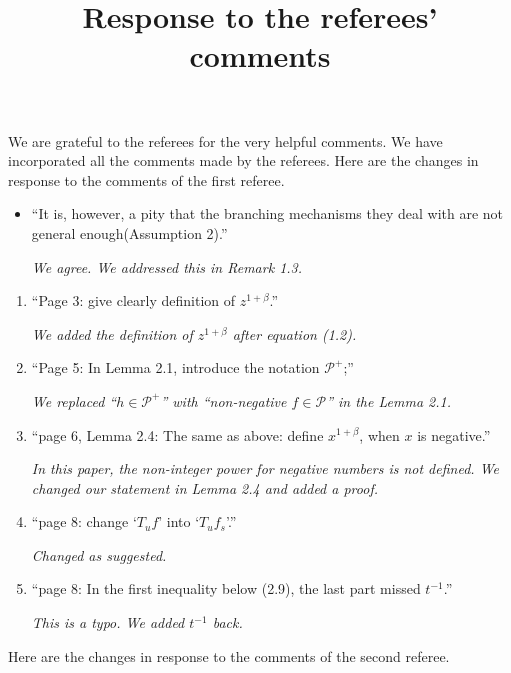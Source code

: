 \documentclass[12pt,a4paper]{amsart}
\title[Response]{\large Response to the referees' comments}
\begin{document}
	\maketitle	
	We are grateful to the referees for the very helpful comments.
	We have incorporated all the comments made by the referees.
	Here are the changes in response to the comments of the first referee.
	
	\begin{itemize}
		\item ``It is, however, a pity that the branching mechanisms they deal with are not general enough(Assumption 2).''
		
		\emph{We agree. We addressed this in  Remark 1.3.}
		
	\end{itemize}
\begin{enumerate}
	\item ``Page 3: give clearly definition of $z^{1+\beta}$.''
	
	\emph{We added the definition of $z^{1+\beta}$ after equation (1.2).}
	
	\item ``Page 5: In Lemma 2.1, introduce the notation $\mathcal P^+$;''
	
	\emph{We replaced ``$h\in \mathcal P^+$'' with ``non-negative $f\in \mathcal P$'' in the Lemma 2.1.}
	
	\item ``page 6, Lemma 2.4: The same as above: define $x^{1+\beta}$, when $x$ is negative.''
	
	\emph{In this paper, 
	the non-integer power for negative numbers is not defined. 
	We changed our statement in Lemma 2.4 and added a proof.}
	
	\item ``page 8: change `$T_uf$' into `$T_uf_s$'.''
	
	\emph{Changed as suggested.}
	
	\item ``page 8: In the first inequality below (2.9), the last part missed $t^{-1}$.''
	
	\emph{This is a typo. We added $t^{-1}$ back.}
	
\end{enumerate}
	Here are the changes in response to the comments of the second referee.
\end{document}
